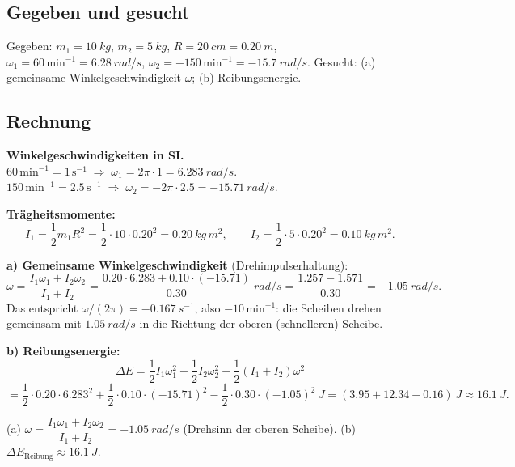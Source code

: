 
\subsection*{Gegeben und gesucht}
Gegeben: $m_1=\qty{10}{kg}$, $m_2=\qty{5}{kg}$, $R=\qty{20}{cm}=\qty{0.20}{m}$,
$\omega_1=60\,\mathrm{min}^{-1}=\qty{6.28}{rad/s}$,
$\omega_2=-150\,\mathrm{min}^{-1}=-\qty{15.7}{rad/s}$.
Gesucht: (a) gemeinsame Winkelgeschwindigkeit $\omega$; (b) Reibungsenergie.

\subsection*{Rechnung}
\textbf{Winkelgeschwindigkeiten in SI.}
$60\,\mathrm{min}^{-1}=1\,\mathrm s^{-1}\;\Rightarrow\;\omega_1=2\pi\cdot
1=\qty{6.283}{rad/s}$. $150\,\mathrm{min}^{-1}=2.5\,\mathrm s^{-1}\;\Rightarrow\;
\omega_2=-2\pi\cdot 2.5=-\qty{15.71}{rad/s}$.

\textbf{Trägheitsmomente:}
\begin{equation}
  I_1=\frac12 m_1R^2=\frac12\cdot10\cdot0.20^2=\qty{0.20}{kg\,m^2},
  \qquad
  I_2=\frac12\cdot5\cdot0.20^2=\qty{0.10}{kg\,m^2}.
\end{equation}

\textbf{a) Gemeinsame Winkelgeschwindigkeit} (Drehimpulserhaltung):
\begin{equation}
  \omega
  = \frac{I_1\omega_1+I_2\omega_2}{I_1+I_2}
  = \frac{0.20\cdot6.283 + 0.10\cdot(-15.71)}{0.30}\ \si{rad/s}
  = \frac{1.257-1.571}{0.30}
  = \qty{-1.05}{rad/s}.
\end{equation}
Das entspricht $\omega/(2\pi)=-\qty{0.167}{s^{-1}}$, also $-10\,\mathrm{min}^{-1}$:
die Scheiben drehen gemeinsam mit $\qty{1.05}{rad/s}$ in die Richtung der
oberen (schnelleren) Scheibe.

\textbf{b) Reibungsenergie:}
\begin{equation}
  \Delta E
  = \frac12 I_1\omega_1^2+\frac12 I_2\omega_2^2 - \frac12(I_1+I_2)\omega^2
\end{equation}
\begin{equation}
  = \frac12\cdot0.20\cdot6.283^2
  + \frac12\cdot0.10\cdot(-15.71)^2
  - \frac12\cdot0.30\cdot(-1.05)^2\ \si{J}
  = (3.95 + 12.34 - 0.16)\ \si{J}
  \approx \qty{16.1}{J}.
\end{equation}

\begin{ergebnis}
(a) $\omega=\dfrac{I_1\omega_1+I_2\omega_2}{I_1+I_2}
=\qty{-1.05}{rad/s}$ (Drehsinn der oberen Scheibe). (b)
$\Delta E_\mathrm{Reibung}\approx\qty{16.1}{J}$.
\end{ergebnis}

